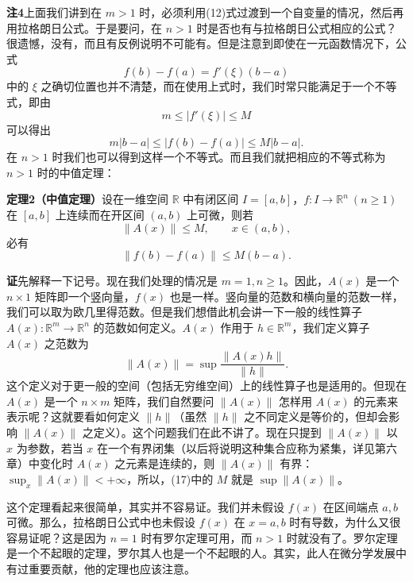 \noindent\textbf{注4}\quad 上面我们讲到在 $m>1$ 时，必须利用(12)式过渡到一个自变量的情况，然后再用拉格朗日公式。于是要问，在 $n>1$ 时是否也有与拉格朗日公式相应的公式？很遗憾，没有，而且有反例说明不可能有。但是注意到即使在一元函数情况下，公式
\[
 f(b)-f(a)=f'(\xi)(b-a)
\]
中的 $\xi$ 之确切位置也并不清楚，而在使用上式时，我们时常只能满足于一个不等式，即由
\[
 m\le |f'(\xi)|\le M
\]
可以得出
\[
 m|b-a|\le |f(b)-f(a)|\le M|b-a|.
\]
在 $n>1$ 时我们也可以得到这样一个不等式。而且我们就把相应的不等式称为 $n>1$ 时的中值定理：

\noindent\textbf{定理2（中值定理）}\quad 设在一维空间 $\mathbb R$ 中有闭区间 $I=[a,b]$，$f:I\to\mathbb R^n\ (n\ge1)$ 在 $[a,b]$ 上连续而在开区间 $(a,b)$ 上可微，则若
\begin{equation}
 \lVert A(x)\rVert\le M,\qquad x\in(a,b),
 \tag{16}
\end{equation}
必有
\begin{equation}
 \lVert f(b)-f(a)\rVert\le M(b-a).
 \tag{17}
\end{equation}

\noindent\textbf{证}\quad 先解释一下记号。现在我们处理的情况是 $m=1,n\ge1$。因此，$A(x)$ 是一个 $n\times1$ 矩阵即一个竖向量，$f(x)$ 也是一样。竖向量的范数和横向量的范数一样，我们可以取为欧几里得范数。但是我们想借此机会讲一下一般的线性算子 $A(x):\mathbb R^m\to\mathbb R^n$ 的范数如何定义。$A(x)$ 作用于 $h\in\mathbb R^m$，我们定义算子 $A(x)$ 之范数为
\begin{equation}
 \lVert A(x)\rVert=\sup\frac{\lVert A(x)h\rVert}{\lVert h\rVert}.
 \tag{18}
\end{equation}
这个定义对于更一般的空间（包括无穷维空间）上的线性算子也是适用的。但现在 $A(x)$ 是一个 $n\times m$ 矩阵，我们自然要问 $\lVert A(x)\rVert$ 怎样用 $A(x)$ 的元素来表示呢？这就要看如何定义 $\lVert h\rVert$（虽然 $\lVert h\rVert$ 之不同定义是等价的，但却会影响 $\lVert A(x)\rVert$ 之定义）。这个问题我们在此不讲了。现在只提到 $\lVert A(x)\rVert$ 以 $x$ 为参数，若当 $x$ 在一个有界闭集（以后将说明这种集合应称为紧集，详见第六章）中变化时 $A(x)$ 之元素是连续的，则 $\lVert A(x)\rVert$ 有界：$\sup_x\lVert A(x)\rVert<+\infty$，所以，(17)中的 $M$ 就是 $\sup\lVert A(x)\rVert$。

这个定理看起来很简单，其实并不容易证。我们并未假设 $f(x)$ 在区间端点 $a,b$ 可微。那么，拉格朗日公式中也未假设 $f(x)$ 在 $x=a,b$ 时有导数，为什么又很容易证呢？这是因为 $n=1$ 时有罗尔定理可用，而 $n>1$ 时就没有了。罗尔定理是一个不起眼的定理，罗尔其人也是一个不起眼的人。其实，此人在微分学发展中有过重要贡献，他的定理也应该注意。

